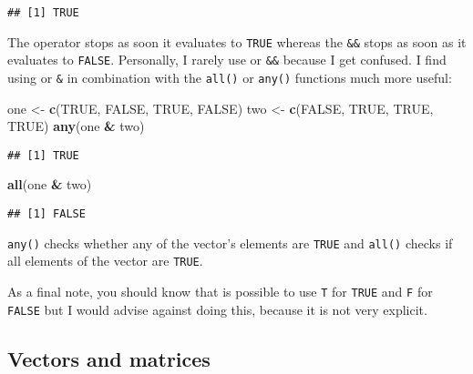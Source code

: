 \documentclass[
]{article}
\newenvironment{Shaded}{\begin{snugshade}}{\end{snugshade}}
\newcommand{\KeywordTok}[1]{\textcolor[rgb]{0.13,0.29,0.53}{\textbf{#1}}}
\newcommand{\NormalTok}[1]{#1}
\newcommand{\OperatorTok}[1]{\textcolor[rgb]{0.81,0.36,0.00}{\textbf{#1}}}
\newcommand{\OtherTok}[1]{\textcolor[rgb]{0.56,0.35,0.01}{#1}}
\newcommand{\StringTok}[1]{\textcolor[rgb]{0.31,0.60,0.02}{#1}}
\begin{document}
\begin{verbatim}
## [1] TRUE
\end{verbatim}

The \texttt{\textbar{}\textbar{}} operator stops as soon it evaluates to \texttt{TRUE} whereas the \texttt{\&\&} stops as soon as it evaluates to \texttt{FALSE}.
Personally, I rarely use \texttt{\textbar{}\textbar{}} or \texttt{\&\&} because I get confused. I find using \texttt{\textbar{}} or \texttt{\&} in combination with the
\texttt{all()} or \texttt{any()} functions much more useful:

\begin{Shaded}
\begin{Highlighting}[]
\NormalTok{one \textless{}{-}}\StringTok{ }\KeywordTok{c}\NormalTok{(}\OtherTok{TRUE}\NormalTok{, }\OtherTok{FALSE}\NormalTok{, }\OtherTok{TRUE}\NormalTok{, }\OtherTok{FALSE}\NormalTok{)}
\NormalTok{two \textless{}{-}}\StringTok{ }\KeywordTok{c}\NormalTok{(}\OtherTok{FALSE}\NormalTok{, }\OtherTok{TRUE}\NormalTok{, }\OtherTok{TRUE}\NormalTok{, }\OtherTok{TRUE}\NormalTok{)}
\KeywordTok{any}\NormalTok{(one }\OperatorTok{\&}\StringTok{ }\NormalTok{two)}
\end{Highlighting}
\end{Shaded}

\begin{verbatim}
## [1] TRUE
\end{verbatim}

\begin{Shaded}
\begin{Highlighting}[]
\KeywordTok{all}\NormalTok{(one }\OperatorTok{\&}\StringTok{ }\NormalTok{two)}
\end{Highlighting}
\end{Shaded}

\begin{verbatim}
## [1] FALSE
\end{verbatim}

\texttt{any()} checks whether any of the vector's elements are \texttt{TRUE} and \texttt{all()} checks if all elements of the vector are
\texttt{TRUE}.

As a final note, you should know that is possible to use \texttt{T} for \texttt{TRUE} and \texttt{F} for \texttt{FALSE} but I
would advise against doing this, because it is not very explicit.

\hypertarget{vectors-and-matrices}{%
\subsection{Vectors and matrices}\label{vectors-and-matrices}}
\end{document}
